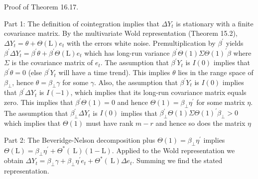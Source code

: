 \documentclass[10pt]{article}
\begin{document}
Proof of Theorem 16.17.

Part 1: The definition of cointegration implies that $\Delta Y_{t}$ is stationary with a finite covariance matrix. By the multivariate Wold representation (Theorem 15.2), $\Delta Y_{t}=\theta+\Theta(\mathrm{L}) e_{t}$ with the errors white noise. Premultiplication by $\beta^{\prime}$ yields $\beta^{\prime} \Delta Y_{t}=\beta^{\prime} \theta+\beta^{\prime} \Theta(\mathrm{L}) e_{t}$ which has long-run variance $\beta^{\prime} \Theta(1) \Sigma \Theta(1)^{\prime} \beta$ where $\Sigma$ is the covariance matrix of $e_{t}$. The assumption that $\beta^{\prime} Y_{t}$ is $I(0)$ implies that $\beta^{\prime} \theta=0$ (else $\beta^{\prime} Y_{t}$ will have a time trend). This implies $\theta$ lies in the range space of $\beta_{\perp}$, hence $\theta=\beta_{\perp} \gamma$ for some $\gamma$. Also, the assumption that $\beta^{\prime} Y_{t}$ is $I(0)$ implies that $\beta^{\prime} \Delta Y_{t}$ is $I(-1)$, which implies that its long-run covariance matrix equals zero. This implies that $\beta^{\prime} \Theta(1)=0$ and hence $\Theta(1)=\beta_{\perp} \eta^{\prime}$ for some matrix $\eta$. The assumption that $\beta_{\perp}^{\prime} \Delta Y_{t}$ is $I(0)$ implies that $\beta_{\perp}^{\prime} \Theta(1) \Sigma \Theta(1)^{\prime} \beta_{\perp}>0$ which implies that $\Theta(1)$ must have rank $m-r$ and hence so does the matrix $\eta$

Part 2: The Beveridge-Nelson decomposition plus $\Theta(1)=\beta_{\perp} \eta^{\prime}$ implies $\Theta(\mathrm{L})=\beta_{\perp} \eta^{\prime}+\Theta^{*}(\mathrm{~L})(1-\mathrm{L})$. Applied to the Wold representation we obtain $\Delta Y_{t}=\beta_{\perp} \gamma+\beta_{\perp} \eta^{\prime} e_{t}+\Theta^{*}(\mathrm{~L}) \Delta e_{t}$. Summing we find the stated representation.
\end{document}
